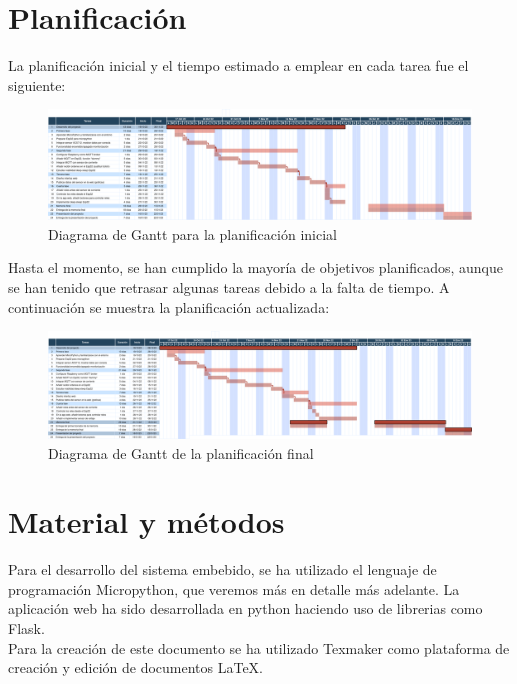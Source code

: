 \begin{titlepage}
\section{Planificación}
La planificación inicial y el tiempo estimado a emplear en cada tarea fue el siguiente:
\begin{figure}[h!]
	\centering
	\includegraphics[width=1\textwidth]{imagenes/gantt_inicial.PNG}
	\caption{Diagrama de Gantt para la planificación inicial}
\end{figure}
Hasta el momento, se han cumplido la mayoría de objetivos planificados, aunque se han tenido que retrasar algunas tareas debido a la falta de tiempo. A continuación se muestra la planificación actualizada:

\begin{figure}[h!]
	\centering
	\includegraphics[width=1\textwidth]{imagenes/gantt_final.PNG}
	\caption{Diagrama de Gantt de la planificación final}
\end{figure}

\newpage
\section{Material y métodos}

Para el desarrollo del sistema embebido, se ha utilizado el lenguaje de programación Micropython, que veremos más en detalle más adelante. La aplicación web ha sido desarrollada en python haciendo uso de librerias como Flask.\\

Para la creación de este documento se ha utilizado Texmaker como plataforma de creación y edición de documentos \LaTeX .\\


\end{titlepage}
